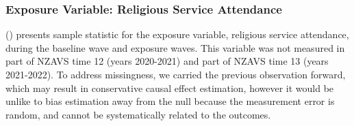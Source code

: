 \documentclass[
  single column]{article}
\begin{document}
\endgroup{}
\endgroup{}

\subsubsection{Exposure Variable: Religious Service
Attendance}\label{appendix-exposure}

()
presents sample statistic for the exposure variable, religious service
attendance, during the baseline wave and exposure waves. This variable
was not measured in part of NZAVS time 12 (years 2020-2021) and part of
NZAVS time 13 (years 2021-2022). To address missingness, we carried the
previous observation forward, which may result in conservative causal
effect estimation, however it would be unlike to bias estimation away
from the null because the measurement error is random, and cannot be
systematically related to the outcomes.

\begingroup\fontsize{12}{14}\selectfont
\begingroup\fontsize{8}{10}\selectfont
\end{document}
